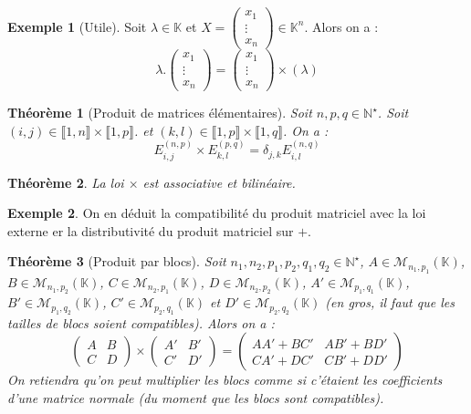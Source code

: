 \documentclass[french]{book}
\newcommand{\N}{\mathbb{N}}
\newcommand{\C}{\mathbb{C}}
\newcommand{\K}{\mathbb{K}}
\newcommand{\st}{^\star}
\theoremstyle{plain}
\newtheorem{thm}{Théorème}[chapter]
\theoremstyle{definition}
\newtheorem{exa}{Exemple}[chapter]
\theoremstyle{remark}
\begin{document}
\begin{exa}[Utile]
	Soit $\lambda\in\K$ et $\displaystyle X=\begin{pmatrix}x_1\\ \vdots \\ x_n\end{pmatrix}\in\K^n$. Alors on a : $$\lambda.\begin{pmatrix}x_1\\ \vdots \\ x_n\end{pmatrix}=\begin{pmatrix}x_1\\ \vdots \\ x_n\end{pmatrix}\times(\lambda)$$
\end{exa}
\begin{thm}[Produit de matrices élémentaires]
	Soit $n,p,q\in\N\st$. Soit $(i,j)\in\llbracket1,n\rrbracket\times\llbracket1,p\rrbracket$. et $(k,l)\in\llbracket1,p\rrbracket\times\llbracket1,q\rrbracket$. On a : $$E_{i,j}^{(n,p)}\times E_{k,l}^{(p,q)}=\delta_{j,k}E_{i,l}^{(n,q)}$$
\end{thm}
\begin{thm}
	La loi $\times$ est associative et bilinéaire.
\end{thm}
\begin{exa}
	On en déduit la compatibilité du produit matriciel avec la loi externe er la distributivité du produit matriciel sur $+$.
\end{exa}
\begin{thm}[Produit par blocs]
	Soit $n_1,n_2,p_1,p_2,q_1,q_2\in\N\st$, $A\in\mathcal{M}_{n_1,p_1}(\K)$, $B\in\mathcal{M}_{n_1,p_2}(\K)$, $C\in\mathcal{M}_{n_2,p_1}(\K)$, $D\in\mathcal{M}_{n_2,p_2}(\K)$, $A'\in\mathcal{M}_{p_1,q_1}(\K)$, $B'\in\mathcal{M}_{p_1,q_2}(\K)$, $C'\in\mathcal{M}_{p_2,q_1}(\K)$ et $D'\in\mathcal{M}_{p_2,q_2}(\K)$ (en gros, il faut que les tailles de blocs soient compatibles). Alors on a : $$\begin{pmatrix}A&B\\C&D\end{pmatrix}\times\begin{pmatrix}A'&B'\\C'&D'\end{pmatrix}=\begin{pmatrix}AA'+BC'&AB'+BD'\\CA'+DC'&CB'+DD'\end{pmatrix}$$ On retiendra qu'on peut multiplier les blocs comme si c'étaient les coefficients d'une matrice normale (du moment que les blocs sont compatibles).
\end{thm}
\end{document}
